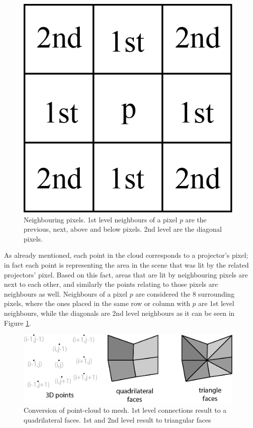 \documentclass[final,12pt,3p]{elsarticle}
\begin{document}
\begin{figure}[!ht]
	\centering
	\includegraphics[scale=0.6]{./images/neighbourPixels.png}
	\caption{\label{fig:neighboringPixels} Neighbouring pixels. 1st level neighbours of a pixel $p$ are the previous, next, above and below pixels. 2nd level are the diagonal pixels.}
\end{figure}

As already mentioned, each point in the cloud corresponds to a projector's pixel; in fact each point is representing the area in the scene that was lit by the related projectors' pixel. Based on this fact, areas that are lit by neighbouring pixels are next to each other, and similarly the points relating to those pixels are neighbours as well. Neighbours of a pixel $p$ are considered the 8 surrounding pixels, where the ones placed in the same row or column with $p$ are 1st level neighbours, while the diagonals are 2nd level neighbours as it can be seen in Figure \ref{fig:neighboringPixels}.

\begin{figure}[!ht]
	\centering
	\includegraphics[scale=0.8]{./images/triang_and_quad_mesh.png}
	\caption{\label{fig:mesh49} Conversion of point-cloud to mesh. 1st level connections result to a quadrilateral faces. 1st and 2nd level result to triangular faces }
\end{figure}
\end{document}

